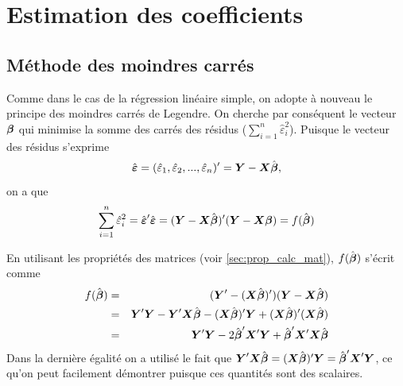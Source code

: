 \section{Estimation des coefficients}
\label{sec:EstimationParamètres}


\subsection{Méthode des moindres carrés}
\label{sec:EstimationRLMMoindresCarrés}


Comme dans le cas de la régression linéaire simple, on adopte à nouveau le principe des moindres carrés de Legendre. On cherche par conséquent le vecteur $\bobeta$ qui minimise la somme des carrés des résidus ($\sum_{i=1} ^n{\hat{\varepsilon}_i^2}$). Puisque le vecteur des résidus s'exprime
	\[ \hboeps= (\hat{\varepsilon}_1 , \hat{\varepsilon}_2, ... , \hat{\varepsilon}_n)' = \boY - \boX \hbobeta, \]
on a que
	\[\sum_{i=1}^n \hat{\varepsilon}_i^2= \hboeps' \hboeps= (\boY - \boX \hbobeta)' (\boY - \boX \bobeta)= f(\hbobeta)\]

En utilisant les propriétés des matrices (voir \ref{sec:prop_calc_mat}), $f(\hbobeta)$ s'écrit comme
\begin{eqnarray*}
	f(\hbobeta)&=&(\boY' - (\boX \hbobeta)')(\boY - \boX \hbobeta) \\
	&=& \boY' \boY - \boY' \boX \hbobeta - (\boX\hbobeta)' \boY + (\boX\hbobeta)' (\boX\hbobeta) \\
	&=& \boY' \boY - 2\hbobeta'\boX'\boY  + \hbobeta'\boX'  \boX\hbobeta
\end{eqnarray*}
Dans la dernière égalité on a utilisé le fait que $\boY'\boX\hbobeta=(\boX\hbobeta)'\boY=\hbobeta'\boX'\boY$, ce qu'on peut facilement démontrer puisque ces quantités sont des scalaires.

